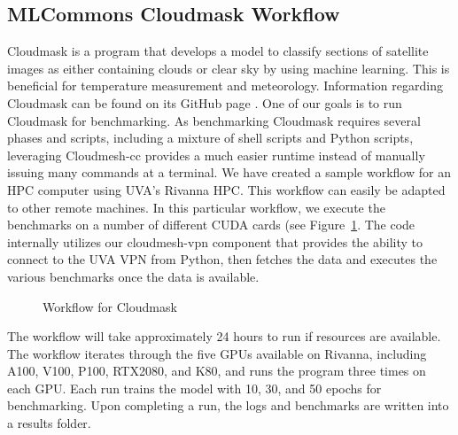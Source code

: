 
\subsection{MLCommons Cloudmask Workflow}
\label{cloudmask-workflow}

Cloudmask is a program that develops a model to classify sections of
satellite images as either containing clouds or clear sky by using
machine learning. This is beneficial for temperature measurement and
meteorology.  Information regarding Cloudmask can be found on its
GitHub page \cite{www-cloudmask}.
One of our goals is to run Cloudmask for benchmarking.
As benchmarking Cloudmask requires
several phases and scripts, including a mixture of shell scripts and
Python scripts, leveraging Cloudmesh-cc provides a much easier runtime
instead of manually issuing many commands at a terminal.
We have created a sample workflow for an HPC
computer using UVA's Rivanna HPC. 
This workflow can easily be adapted to other remote machines. In this
particular workflow, we execute the benchmarks on a number of different
CUDA cards (see Figure~\ref{fig:cloudmaskwf}. The code internally utilizes
our cloudmesh-vpn component that provides the ability to
connect to the UVA VPN from Python, then fetches the data and executes
the various benchmarks once the data is available.


\begin{figure}[htb]
  \vspace{-1cm}
  \caption{Workflow for Cloudmask}\label{fig:cloudmaskwf}
\end{figure}


The workflow will take approximately 24 hours to run if resources are
available. The workflow iterates through the five GPUs available on
Rivanna, including A100, V100, P100, RTX2080, and K80, and runs the program
three times on each GPU. Each run trains the model with 10, 30, and 50
epochs for benchmarking.  Upon completing a run, the logs and
benchmarks are written into a results folder.

